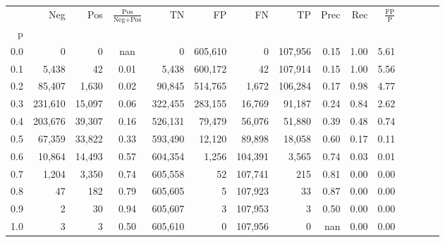 \begin{tabular}{rrrcrrrrrrrrrrr}
\toprule
{} &      Neg &     Pos & $\frac{\text{Pos}}{\text{Neg}+\text{Pos}}$ &       TN &       FP &       FN &       TP &  Prec &   Rec & $\frac{\text{FP}}{\text{P}}$ \\
p   &          &         &                                            &          &          &          &          &       &       &                              \\
\midrule
0.0 &        0 &       0 &                                        nan &        0 &  605,610 &        0 &  107,956 &  0.15 &  1.00 &                         5.61 \\
0.1 &    5,438 &      42 &                                       0.01 &    5,438 &  600,172 &       42 &  107,914 &  0.15 &  1.00 &                         5.56 \\
0.2 &   85,407 &   1,630 &                                       0.02 &   90,845 &  514,765 &    1,672 &  106,284 &  0.17 &  0.98 &                         4.77 \\
0.3 &  231,610 &  15,097 &                                       0.06 &  322,455 &  283,155 &   16,769 &   91,187 &  0.24 &  0.84 &                         2.62 \\
0.4 &  203,676 &  39,307 &                                       0.16 &  526,131 &   79,479 &   56,076 &   51,880 &  0.39 &  0.48 &                         0.74 \\
0.5 &   67,359 &  33,822 &                                       0.33 &  593,490 &   12,120 &   89,898 &   18,058 &  0.60 &  0.17 &                         0.11 \\
0.6 &   10,864 &  14,493 &                                       0.57 &  604,354 &    1,256 &  104,391 &    3,565 &  0.74 &  0.03 &                         0.01 \\
0.7 &    1,204 &   3,350 &                                       0.74 &  605,558 &       52 &  107,741 &      215 &  0.81 &  0.00 &                         0.00 \\
0.8 &       47 &     182 &                                       0.79 &  605,605 &        5 &  107,923 &       33 &  0.87 &  0.00 &                         0.00 \\
0.9 &        2 &      30 &                                       0.94 &  605,607 &        3 &  107,953 &        3 &  0.50 &  0.00 &                         0.00 \\
1.0 &        3 &       3 &                                       0.50 &  605,610 &        0 &  107,956 &        0 &   nan &  0.00 &                         0.00 \\
\bottomrule
\end{tabular}
